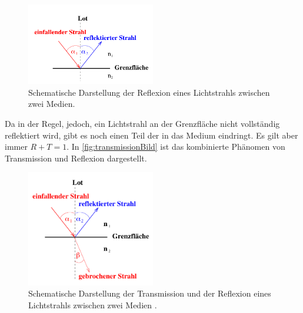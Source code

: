 \begin{figure}[H]
    \centering
    \includegraphics[width=0.5\textwidth]{data/reflexion.png}
    \caption{Schematische Darstellung der Reflexion eines Lichtstrahls zwischen zwei Medien\cite{Anleitung400}.}
    \label{fig:reflexionBild}
\end{figure}

\noindent
Da in der Regel, jedoch, ein Lichtstrahl an der Grenzfläche nicht vollständig reflektiert wird, gibt es noch einen Teil der in das Medium eindringt. Es gilt aber immer $R+T=1$.
In \autoref{fig:transmissionBild} ist das kombinierte Phänomen von Transmission und Reflexion dargestellt.

\begin{figure}[H]
    \centering
    \includegraphics[width=0.5\textwidth]{data/transmission.png}
    \caption{Schematische Darstellung der Transmission und der Reflexion eines Lichtstrahls zwischen zwei Medien \cite{Anleitung400}.}
    \label{fig:transmissionBild}
\end{figure}

